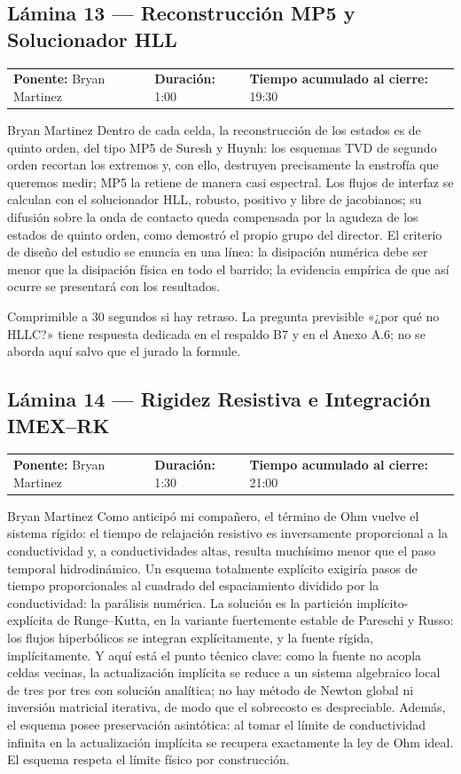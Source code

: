 \documentclass[11pt,letterpaper]{article}
\makeatletter
\newcommand{\lamina}[5]{%
  \subsection*{Lámina #1 --- #2}
  \noindent
  \begin{tabular}{@{}llll@{}}
    \textbf{Ponente:} #3 &\quad \textbf{Duración:} #4 &\quad
    \textbf{Tiempo acumulado al cierre:} #5 &
  \end{tabular}
  \vspace{2pt}}
\makeatother
\begin{document}
\lamina{13}{Reconstrucción MP5 y Solucionador HLL}{Bryan Martinez}{1:00}{19:30}

\begin{parlamento}{Bryan Martinez}
Dentro de cada celda, la reconstrucción de los estados es de quinto orden,
del tipo MP5 de Suresh y Huynh: los esquemas TVD de segundo orden recortan
los extremos y, con ello, destruyen precisamente la enstrofía que queremos
medir; MP5 la retiene de manera casi espectral. Los flujos de interfaz se
calculan con el solucionador HLL, robusto, positivo y libre de jacobianos;
su difusión sobre la onda de contacto queda compensada por la agudeza de los
estados de quinto orden, como demostró el propio grupo del director. El
criterio de diseño del estudio se enuncia en una línea: la disipación
numérica debe ser menor que la disipación física en todo el barrido; la
evidencia empírica de que así ocurre se presentará con los resultados.
\end{parlamento}

\begin{indicaciones}
Comprimible a 30 segundos si hay retraso. La pregunta previsible «¿por qué
no HLLC?» tiene respuesta dedicada en el respaldo B7 y en el Anexo A.6; no
se aborda aquí salvo que el jurado la formule.
\end{indicaciones}

\lamina{14}{Rigidez Resistiva e Integración IMEX--RK}{Bryan Martinez}{1:30}{21:00}

\begin{parlamento}{Bryan Martinez}
Como anticipó mi compañero, el término de Ohm vuelve el sistema rígido: el
tiempo de relajación resistivo es inversamente proporcional a la
conductividad y, a conductividades altas, resulta muchísimo menor que el
paso temporal hidrodinámico. Un esquema totalmente explícito exigiría pasos
de tiempo proporcionales al cuadrado del espaciamiento dividido por la
conductividad: la parálisis numérica. La solución es la partición
implícito-explícita de Runge--Kutta, en la variante fuertemente estable de
Pareschi y Russo: los flujos hiperbólicos se integran explícitamente, y la
fuente rígida, implícitamente. Y aquí está el punto técnico clave: como la
fuente no acopla celdas vecinas, la actualización implícita se reduce a un
sistema algebraico local de tres por tres con solución analítica; no hay
método de Newton global ni inversión matricial iterativa, de modo que el
sobrecosto es despreciable. Además, el esquema posee preservación
asintótica: al tomar el límite de conductividad infinita en la actualización
implícita se recupera exactamente la ley de Ohm ideal. El esquema respeta el
límite físico por construcción.
\end{parlamento}
\end{document}

